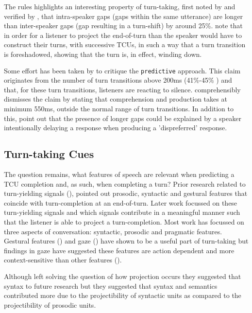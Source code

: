 \documentclass[logo,bsc,singlespacing,parskip]{infthesis}
\begin{document}
The rules highlights an interesting property of turn-taking, first noted by \cite{Sacks1974} and verified by \cite{tenBosch2005}, that intra-speaker gaps (gaps within the same utterance) are longer than inter-speaker gaps (gap resulting in a turn-shift) by around 25\%.
\fi
\cite{Sacks1974} note that in order for a listener to project the end-of-turn than the speaker would have to construct their turns, with successive TCUs, in such a way that a turn transition is foreshadowed, showing that the turn is, in effect, winding down.

Some effort has been taken by \cite{HelEdl2010} to critique the \texttt{predictive} approach.  
This claim originates from the number of turn transitions above 200ms (41\%-45\% \cite{HelEdl2010}) and that, for these turn transitions, listeners are reacting to silence. \cite{LevTor2015} comprehensibly dismisses the claim by stating that comprehension and production takes at minimum 550ms, outside the normal range of turn transitions. In addition to this, \cite{Riest2015} point out that the presence of longer gaps could be explained by a speaker intentionally delaying a response when producing a 'dispreferred' response.

\subsection{Turn-taking Cues}
The question remains, what features of speech are relevant when predicting a TCU completion and, as such, when completing a turn? 
Prior research related to turn-yielding signals (\cite{Duncan1972}), pointed out prosodic, syntactic and gestural features that coincide with turn-completion at an end-of-turn. Later work focussed on these turn-yielding signals and which signals contribute in a meaningful manner such that the listener is able to project a turn-completion. 
Most work has focussed on three aspects of conversation: syntactic, prosodic and pragmatic features. Gestural features (\cite{Duncan1972}) and gaze (\cite{Kendon1967}) have shown to be a useful part of turn-taking but findings in gaze have suggested these features are action dependent and more context-sensitive than other features (\cite{Clayman2013}).

Although \cite{Sacks1974} left solving the question of how projection occurs they suggested that syntax to future research but they suggested that syntax and semantics contributed more due to the projectibility of syntactic units as compared to the projectibility of prosodic units. 
\end{document}
